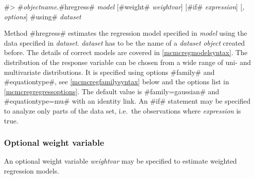  #> #{\em objectname}.#hregress# {\em model} [#weight# {\em weightvar}] [#if# {\em expression}] [{\em , options}] #using# {\em dataset}

Method #hregress# estimates the regression model specified in {\em
model} using the data specified in {\em dataset}. {\em dataset}
has to be the name of a {\em dataset object} created before. The
details of correct models are covered in \autoref{mcmcregmodelsyntax}.
The distribution of the response variable can be chosen from a wide
range of uni- and multivariate distributions. It is
specified using options
#family# and #equationtype#, see \autoref{mcmcregfamilysyntax} below and the options list in
\autoref{mcmcregregressoptions}. The default value is #family=gaussian# and #equationtype=mu#
with an identity link.  An #if# statement may be specified to analyze
only parts of the data set, i.e.~the observations where {\em
expression} is true.

\subsubsection{Optional weight variable}
\label{weightspecification}

An optional weight variable {\em weightvar} may be specified to
estimate weighted regression models.


%

